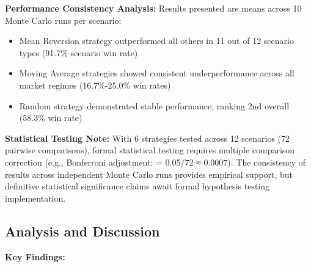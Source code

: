 \documentclass[11pt,a4paper]{article}
\begin{document}
\textbf{Performance Consistency Analysis:}
Results presented are means across 10 Monte Carlo runs per scenario:
\begin{itemize}
\item Mean Reversion strategy outperformed all others in 11 out of 12 scenario types (91.7\% scenario win rate)
\item Moving Average strategies showed consistent underperformance across all market regimes (16.7\%-25.0\% win rates)
\item Random strategy demonstrated stable performance, ranking 2nd overall (58.3\% win rate)

\end{itemize}
\textbf{Statistical Testing Note:} With 6 strategies tested across 12 scenarios (72 pairwise comparisons), formal statistical testing requires multiple comparison correction (e.g., Bonferroni adjustment: \alpha = 0.05/72 ≈ 0.0007). The consistency of results across independent Monte Carlo runs provides empirical support, but definitive statistical significance claims await formal hypothesis testing implementation.

\subsection{Analysis and Discussion}

\textbf{Key Findings:}
\end{document}
